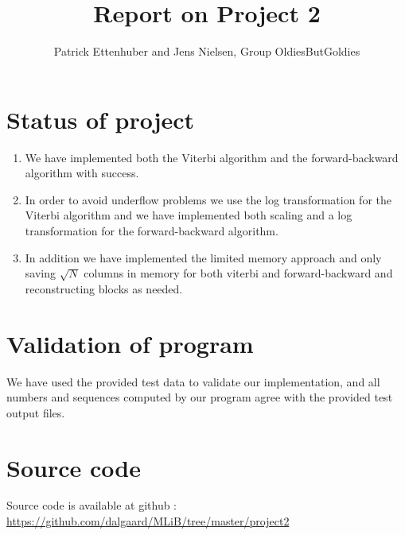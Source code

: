 \documentclass[11pt]{article}
\title{Report on Project 2}
\author{Patrick Ettenhuber and Jens Nielsen, Group OldiesButGoldies}
\begin{document}
\maketitle

\section*{Status of project}

\begin{enumerate}
\item We have implemented both the Viterbi algorithm and the
  forward\--backward algorithm with success.
\item In order to avoid underflow problems we use the log transformation for 
	the Viterbi algorithm and we have implemented both scaling  and a log 
	transformation for the forward\--backward algorithm.
\item In addition we have implemented the limited memory approach and
  only saving $\sqrt{N}$ columns in memory for both viterbi and
  forward\--backward and reconstructing blocks as needed.
\end{enumerate}

\section*{Validation of program}

We have used the provided test data to
validate our implementation, and all numbers and sequences computed by
our program agree with the provided test output files.

\section*{Source code}

Source code is available at github : \url{https://github.com/dalgaard/MLiB/tree/master/project2}
\end{document}
